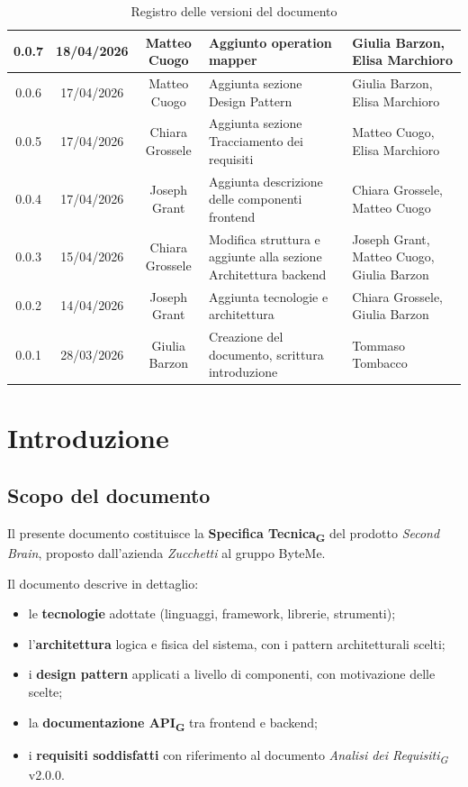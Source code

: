\documentclass[11pt,a4paper]{article}
\newcommand{\gls}[1]{#1\textsubscript{G}}
\begin{document}
\begin{table}[H]
\begin{tabular}{|c|c|c|>{\raggedright\arraybackslash}p{}|p{}|}
        \hline
        0.0.7 & 18/04/2026 & Matteo Cuogo & Aggiunto operation mapper & Giulia Barzon, Elisa Marchioro\\
        \hline
        0.0.6 & 17/04/2026 & Matteo Cuogo & Aggiunta sezione Design Pattern & Giulia Barzon, Elisa Marchioro\\
        \hline
        0.0.5 & 17/04/2026 & Chiara Grossele & Aggiunta sezione Tracciamento dei requisiti & Matteo Cuogo, Elisa Marchioro\\
        \hline
        0.0.4 & 17/04/2026 & Joseph Grant & Aggiunta descrizione delle componenti frontend & Chiara Grossele, Matteo Cuogo\\
        \hline
        0.0.3 & 15/04/2026 & Chiara Grossele & Modifica struttura e aggiunte alla sezione Architettura backend & Joseph Grant, Matteo Cuogo, Giulia Barzon \\
        \hline
        0.0.2 & 14/04/2026 & Joseph Grant & Aggiunta tecnologie e architettura & Chiara Grossele, Giulia Barzon\\
        \hline
        0.0.1 & 28/03/2026 & Giulia Barzon & Creazione del documento, scrittura introduzione & Tommaso Tombacco \\
        \hline
    \end{tabular}
    \caption{Registro delle versioni del documento}
    \label{tab:versionamento}
\end{table}
\newpage

\tableofcontents
\thispagestyle{empty}
\newpage

\setcounter{page}{1}

\section{Introduzione}
\subsection{Scopo del documento}
Il presente documento costituisce la \textbf{\gls{Specifica Tecnica}} del prodotto \textit{Second Brain}, proposto dall'azienda \textit{Zucchetti} al gruppo ByteMe.
 
Il documento descrive in dettaglio:
\begin{itemize}
  \item le \textbf{tecnologie} adottate (linguaggi, framework, librerie, strumenti);
  \item l'\textbf{architettura} logica e fisica del sistema, con i pattern architetturali scelti;
  \item i \textbf{design pattern} applicati a livello di componenti, con motivazione delle scelte;
  \item la \textbf{documentazione \gls{API}} tra frontend e backend;
  \item i \textbf{requisiti soddisfatti} con riferimento al documento \textit{\gls{Analisi dei Requisiti}} v2.0.0.
\end{itemize}
 
\end{document}
